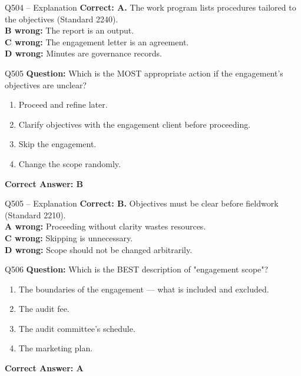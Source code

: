 \documentclass[aspectratio=169,10pt]{beamer}
\begin{document}
	\begin{frame}[t]{Q504 -- Explanation}
		\small
		\textbf{Correct: A.} The work program lists procedures tailored to the objectives (Standard 2240). \\[4pt]
		\textbf{B wrong:} The report is an output. \\[2pt]
		\textbf{C wrong:} The engagement letter is an agreement. \\[2pt]
		\textbf{D wrong:} Minutes are governance records.
	\end{frame}
	
	\begin{frame}[t]{Q505}
		\small
		\textbf{Question:} Which is the MOST appropriate action if the engagement's objectives are unclear?
		\begin{enumerate}[label=\Alph*.,itemsep=1pt,topsep=2pt]
			\item Proceed and refine later.
			\item Clarify objectives with the engagement client before proceeding.
			\item Skip the engagement.
			\item Change the scope randomly.
		\end{enumerate}
		\vspace{4pt}
		\textbf{Correct Answer: B}
	\end{frame}
	
	\begin{frame}[t]{Q505 -- Explanation}
		\small
		\textbf{Correct: B.} Objectives must be clear before fieldwork (Standard 2210). \\[4pt]
		\textbf{A wrong:} Proceeding without clarity wastes resources. \\[2pt]
		\textbf{C wrong:} Skipping is unnecessary. \\[2pt]
		\textbf{D wrong:} Scope should not be changed arbitrarily.
	\end{frame}
	
	\begin{frame}[t]{Q506}
		\small
		\textbf{Question:} Which is the BEST description of "engagement scope"?
		\begin{enumerate}[label=\Alph*.,itemsep=1pt,topsep=2pt]
			\item The boundaries of the engagement — what is included and excluded.
			\item The audit fee.
			\item The audit committee's schedule.
			\item The marketing plan.
		\end{enumerate}
		\vspace{4pt}
		\textbf{Correct Answer: A}
	\end{frame}
	
\end{document}
